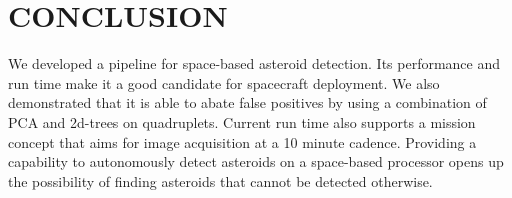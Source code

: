 \documentclass{article}
\begin{document}
\vspace{-0.3cm}
\section{CONCLUSION}
We developed a pipeline for space-based asteroid detection. Its performance and run time make it a good candidate for spacecraft deployment.
We also demonstrated that it is able to abate false positives by using a combination of PCA and 2d-trees on quadruplets. Current run time also supports a mission concept that aims for image acquisition at a 10 minute cadence. Providing a capability to autonomously detect asteroids on a space-based processor opens up the possibility of finding asteroids that cannot be detected otherwise.


%
\end{document}
